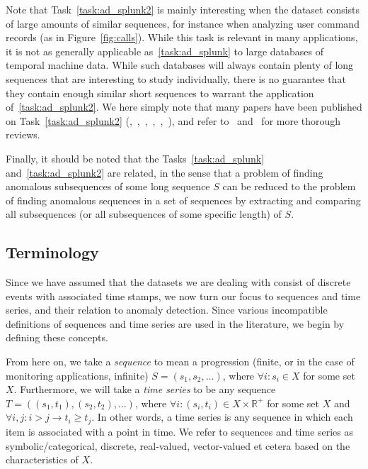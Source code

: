 Note that Task~\ref{task:ad_splunk2} is mainly interesting when the dataset consists of large amounts of similar sequences, for instance when analyzing user command records (as in Figure~\ref{fig:calls}). While this task is relevant in many applications, it is not as generally applicable as~\ref{task:ad_splunk} to large databases of temporal machine data. While such databases will always contain plenty of long sequences that are interesting to study individually, there is no guarantee that they contain enough similar short sequences to warrant the application of~\ref{task:ad_splunk2}. We here simply note that many papers have been published on Task~\ref{task:ad_splunk2} (\cite{blender},~\cite{chan},~\cite{ye},~\cite{forrest},~\cite{sekar1},~\cite{sekar2}), and refer to~\cite{chandola2} and~\cite{chandola3} for more thorough reviews.

Finally, it should be noted that the Tasks~\ref{task:ad_splunk} and~\ref{task:ad_splunk2} are related, in the sense that a problem of finding anomalous subsequences of some long sequence $S$ can be reduced to the problem of finding anomalous sequences in a set of sequences by extracting and comparing all subsequences (or all subsequences of some specific length) of $S$.


\subsection{Terminology}
\label{sect:terminology}

Since we have assumed that the datasets we are dealing with consist of discrete events with associated time stamps, we now turn our focus to sequences and time series, and their relation to anomaly detection. Since various incompatible definitions of sequences and time series are used in the literature, we begin by defining these concepts.

From here on, we take a \emph{sequence} to mean a progression (finite, or in the case of monitoring applications, infinite) $S = (s_1, s_2, \dots)$, where $\forall i: s_i \in X$ for some set $X$. Furthermore, we will take a \emph{time series} to be any sequence $T = ((s_1, t_1), (s_2, t_2), \dots)$, where $\forall i: (s_i, t_i) \in X \times \mathbb{R}^+$ for some set $X$ and $\forall i, j: i > j \rightarrow t_i \geq t_j$. In other words, a time series is any sequence in which each item is associated with a point in time. We refer to sequences and time series as symbolic/categorical, discrete, real-valued, vector-valued et cetera based on the characteristics of $X$.

